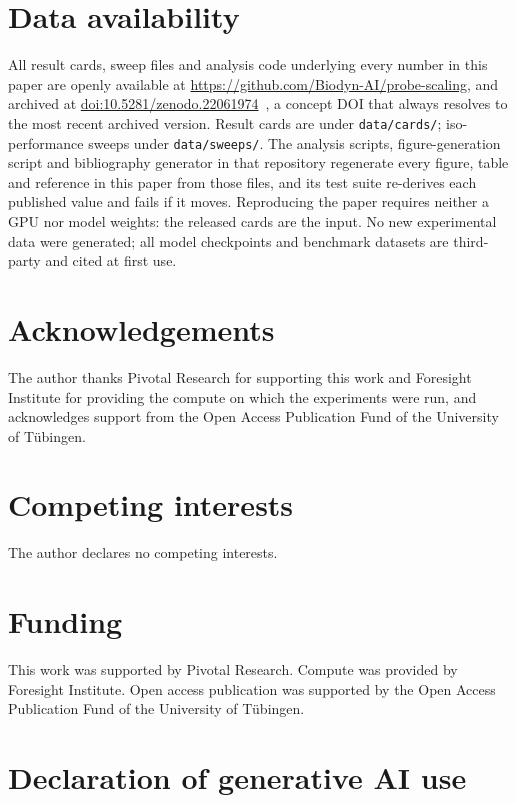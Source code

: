 \documentclass[11pt]{article}
\providecommand{\doi}[1]{\href{https://doi.org/#1}{doi:#1}}
\begin{document}
\section*{Data availability}

\begin{sloppypar}
All result cards, sweep files and analysis code underlying every number in this
paper are openly available at \url{https://github.com/Biodyn-AI/probe-scaling},
and archived at \doi{10.5281/zenodo.22061974}~\citep{kendiukhov2026code}, a
concept DOI that always resolves to the most recent archived version. Result cards are under
\texttt{data/cards/}; iso-performance sweeps under \texttt{data/sweeps/}. The analysis scripts, figure-generation script and bibliography generator in
that repository regenerate every figure, table and reference in this paper from
those files, and its test suite re-derives each published value and fails if it
moves. Reproducing the paper requires neither a GPU nor model weights: the
released cards are the input. No new experimental data were generated; all model checkpoints and
benchmark datasets are third-party and cited at first use.
\end{sloppypar}

\section*{Acknowledgements}

The author thanks Pivotal Research for supporting this work and Foresight
Institute for providing the compute on which the experiments were run, and
acknowledges support from the Open Access Publication Fund of the University of
T\"ubingen.

\section*{Competing interests}

The author declares no competing interests.

\section*{Funding}

This work was supported by Pivotal Research. Compute was provided by Foresight
Institute. Open access publication was supported by the Open Access Publication
Fund of the University of T\"ubingen.

\section*{Declaration of generative AI use}
\end{document}
